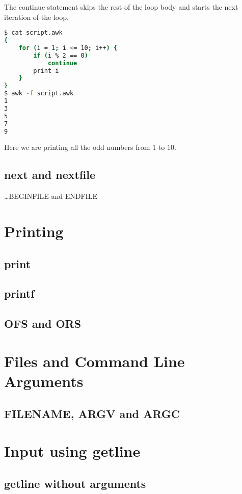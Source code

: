 The continue statement skips the rest of the loop body and starts the next iteration of the loop.

\begin{lstlisting}[language=bash]
$ cat script.awk
{
    for (i = 1; i <= 10; i++) {
        if (i % 2 == 0)
            continue
        print i
    }
}
$ awk -f script.awk
1
3
5
7
9
\end{lstlisting}

Here we are printing all the odd numbers from $1$ to $10$.

\subsection{next and nextfile}


\dots BEGINFILE and ENDFILE

\section{Printing}

\subsection{print}

\subsection{printf}

\subsection{OFS and ORS}

\section{Files and Command Line Arguments}

\subsection{FILENAME, ARGV and ARGC}

\section{Input using getline}

\subsection{getline without arguments}

